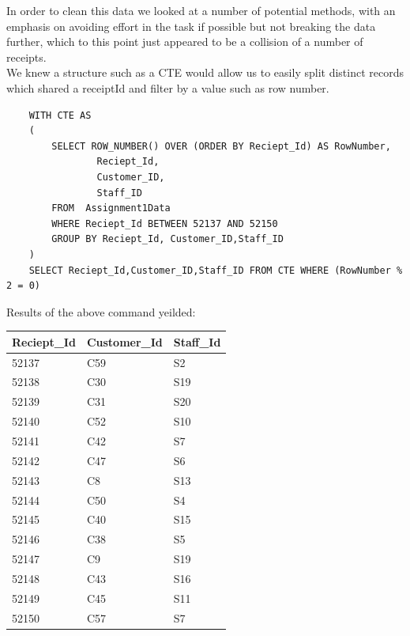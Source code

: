 \documentclass{article}
\newcounter{num}
\begin{document}
            In order to clean this data we looked at a number of potential methods, with an 
            emphasis on avoiding effort in the task if possible but not breaking the data further,
            which to this point just appeared to be a collision of a number of receipts.
            \\
            We knew a structure such as a CTE\cite{CTE} would allow us to easily split
            distinct records which shared a receiptId and filter by a value such as row number.
            \begin{verbatim}
    WITH CTE AS
    (
        SELECT ROW_NUMBER() OVER (ORDER BY Reciept_Id) AS RowNumber,
                Reciept_Id,
                Customer_ID,
                Staff_ID
        FROM  Assignment1Data
        WHERE Reciept_Id BETWEEN 52137 AND 52150
        GROUP BY Reciept_Id, Customer_ID,Staff_ID 
    )
    SELECT Reciept_Id,Customer_ID,Staff_ID FROM CTE WHERE (RowNumber % 2 = 0)
            \end{verbatim}

            \newpage
            Results of the above command yeilded:
            \begin{table}[H]
                \centering
                \begin{tabular}{|l|l|l|}
                \hline
                Reciept\_Id & Customer\_Id & Staff\_Id \\ \hline
                52137       & C59          & S2        \\ \hline
                52138       & C30          & S19       \\ \hline
                52139       & C31          & S20       \\ \hline
                52140       & C52          & S10       \\ \hline
                52141       & C42          & S7        \\ \hline
                52142       & C47          & S6        \\ \hline
                52143       & C8           & S13       \\ \hline
                52144       & C50          & S4        \\ \hline
                52145       & C40          & S15       \\ \hline
                52146       & C38          & S5        \\ \hline
                52147       & C9           & S19       \\ \hline
                52148       & C43          & S16       \\ \hline
                52149       & C45          & S11       \\ \hline
                52150       & C57          & S7        \\ \hline
                \end{tabular}
            \end{table}
            
\end{document}
